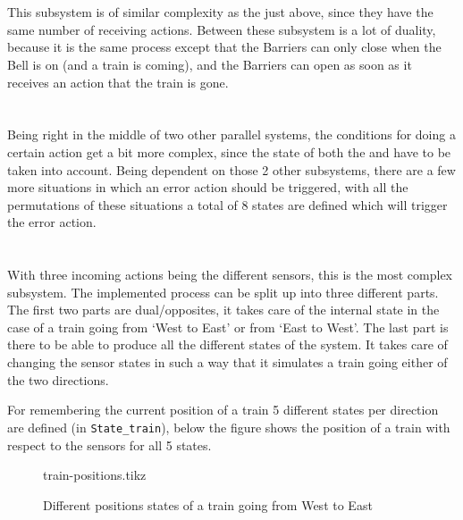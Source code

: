 \documentclass[final]{report}
\begin{document}
\section{}
This subsystem is of similar complexity as the  just above, since they have the same number of receiving actions.
Between these subsystem is a lot of duality, because it is the same process except that the Barriers can only close when the Bell is on (and a train is coming), and the Barriers can open as soon as it receives an action that the train is gone.

\section{}
Being right in the middle of two other parallel systems, the conditions for doing a certain action get a bit more complex, since the state of both the  and   have to be taken into account.
Being dependent on those 2 other subsystems, there are a few more situations in which an error action should be triggered, with all the permutations of these situations a total of 8 states are defined which will trigger the error action.

\section{}
With three incoming actions being the different sensors, this is the most complex subsystem.
The implemented process can be split up into three different parts.
The first two parts are dual/opposites, it takes care of the internal state in the case of a train going from `West to East' or from `East to West'.
The last part is there to be able to produce all the different states of the system.
It takes care of changing the sensor states in such a way that it simulates a train going either of the two directions.

For remembering the current position of a train 5 different states per direction are defined (in \texttt{State\_train}), below the figure shows the position of a train with respect to the sensors for all 5 states.

\begin{figure}[H]
    \centering
    {train-positions.tikz}
    \caption{Different positions states of a train going from West to East}
    \label{fig:train-positions}
\end{figure}
\end{document}
